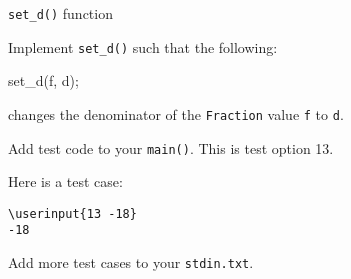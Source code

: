\verb!set_d()! function

Implement \verb!set_d()! such that the following:
\begin{console}
set_d(f, d);
\end{console}
changes the denominator of the \verb!Fraction! value \verb!f! to \verb!d!.

Add test code to your \verb!main()!. This is test option 13.

Here is a test case:

\resett
\nextt
\begin{Verbatim}[frame=single, commandchars=\\\{\}]
\userinput{13 -18}
-18
\end{Verbatim}

Add more test cases to your \verb!stdin.txt!.
